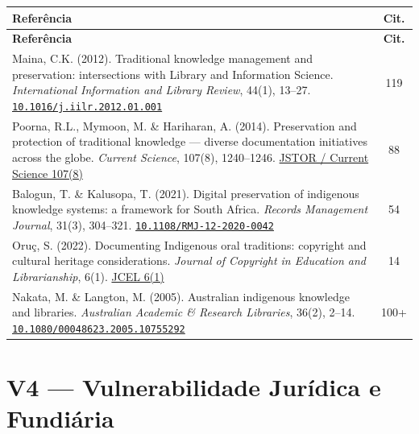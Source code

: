 \documentclass[a4paper,11pt]{article}
\newcommand{\doi}[1]{\href{https://doi.org/#1}{\texttt{#1}}}
\begin{document}
\begin{longtable}{>{\raggedright\arraybackslash}p{} c}
\toprule
\textbf{Referência} & \textbf{Cit.} \\
\midrule
\endfirsthead
\toprule
\textbf{Referência} & \textbf{Cit.} \\
\midrule
\endhead

Maina, C.K. (2012). Traditional knowledge management and preservation: intersections with Library and Information Science. \textit{International Information and Library Review}, 44(1), 13--27.\newline
\doi{10.1016/j.iilr.2012.01.001} & 119 \\
\addlinespace

Poorna, R.L., Mymoon, M. \& Hariharan, A. (2014). Preservation and protection of traditional knowledge --- diverse documentation initiatives across the globe. \textit{Current Science}, 107(8), 1240--1246.\newline
\href{https://www.jstor.org/stable/24103468}{JSTOR / Current Science 107(8)} & 88 \\
\addlinespace

Balogun, T. \& Kalusopa, T. (2021). Digital preservation of indigenous knowledge systems: a framework for South Africa. \textit{Records Management Journal}, 31(3), 304--321.\newline
\doi{10.1108/RMJ-12-2020-0042} & 54 \\
\addlinespace

Oruç, S. (2022). Documenting Indigenous oral traditions: copyright and cultural heritage considerations. \textit{Journal of Copyright in Education and Librarianship}, 6(1).\newline
\href{https://doi.org/10.17161/jcel.v6i1}{JCEL 6(1)} & 14 \\
\addlinespace

Nakata, M. \& Langton, M. (2005). Australian indigenous knowledge and libraries. \textit{Australian Academic \& Research Libraries}, 36(2), 2--14.\newline
\doi{10.1080/00048623.2005.10755292} & 100+ \\

\bottomrule
\end{longtable}

\section{V4 --- Vulnerabilidade Jurídica e Fundiária}
\end{document}

